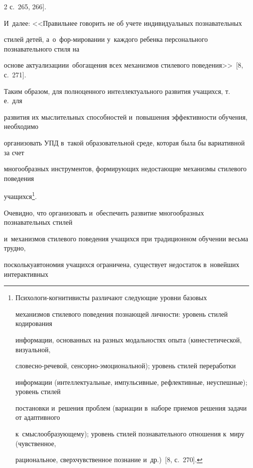 \begin{multicols}{2}
   с.~265, 266].\linebreak


    И~далее: <<Правильнее говорить не об учете индивидуальных познавательных


стилей детей, а~о~фор-\linebreak мировании у~каждого ребенка персонального познавательного стиля на


основе актуализации\linebreak и~обо\-га\-ще\-ния всех механизмов стилевого поведения>>~[8, с.~271].





   Таким образом, для полноценного интеллектуального развития учащихся, т.\,е.\ для


развития их мыслительных способностей и~повышения эффективности обучения, необходимо


организовать УПД в~такой образовательной среде, которая была бы вариативной за счет


многообразных инструментов, формирующих недостающие механизмы стилевого поведения


учащихся\footnote{Психологи-когнитивисты различают следующие уровни базовых


механизмов стилевого поведения познающей личности: уровень стилей кодирования


информации, основанных на разных модальностях опыта (кинестетической, визуальной,


   сло\-вес\-но-ре\-че\-вой, сен\-сор\-но-эмо\-ци\-о\-наль\-ной); уровень стилей переработки


информации (интеллектуальные, импульсивные, рефлективные, неуспешные); уровень стилей


постановки и~решения проблем (вариации в~наборе приемов решения задачи от адаптивного


к~смыс\-ло\-обра\-зу\-юще\-му); уровень стилей познавательного отношения к~миру (чувственное,


рациональное, сверхчувственное познание и~др.)~[8, с.~270].}.





   Очевидно, что организовать и~обеспечить развитие многообразных познавательных стилей


и~механизмов стилевого поведения учащихся при традиционном обучении весьма трудно,


поскольку\linebreak автономия учащихся ограничена, существует недостаток в~новейших интерактивных



\end{multicols}
